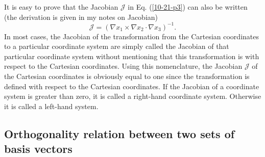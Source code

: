 \documentclass{article}
\begin{document}
It is easy to prove that the Jacobian $\mathcal{J}$ in Eq. (\ref{10-21-p3})
can also be written (the derivation is given in my notes on Jacobian)
\begin{equation}
  \label{10-21-p4} \mathcal{J}= (\nabla x_1 \times \nabla x_2 \cdot \nabla
  x_3)^{- 1} .
\end{equation}
In most cases, the Jacobian of the transformation from the Cartesian
coordinates to a particular coordinate system are simply called the Jacobian
of that particular coordinate system without mentioning that this
transformation is with respect to the Cartesian coordinates. Using this
nomenclature, the Jacobian $\mathcal{J}$ of the Cartesian coordinates is
obviously equal to one since the transformation is defined with respect to the
Cartesian coordinates. If the Jacobian of a coordinate system is greater than
zero, it is called a right-hand coordinate system. Otherwise it is called a
left-hand system.

\subsection{Orthogonality relation between two sets of basis vectors}
\end{document}
